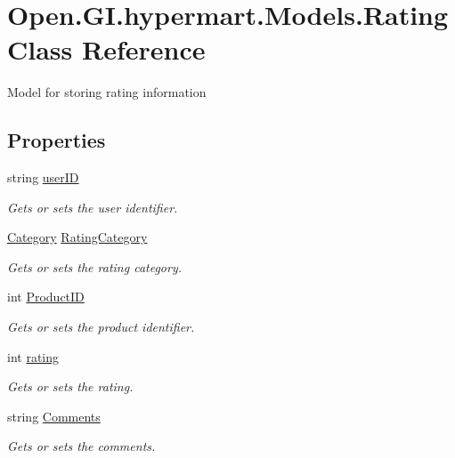 \hypertarget{class_open_1_1_g_i_1_1hypermart_1_1_models_1_1_rating}{}\section{Open.\+G\+I.\+hypermart.\+Models.\+Rating Class Reference}
\label{class_open_1_1_g_i_1_1hypermart_1_1_models_1_1_rating}


Model for storing rating information  


\subsection*{Properties}
\begin{DoxyCompactItemize}
\item 
string \hyperlink{class_open_1_1_g_i_1_1hypermart_1_1_models_1_1_rating_a1e8a569cc68356a222db0eee305273f2}{user\+I\+D}
\begin{DoxyCompactList}\small\item\em Gets or sets the user identifier. \end{DoxyCompactList}\item 
\hyperlink{class_open_1_1_g_i_1_1hypermart_1_1_models_1_1_category}{Category} \hyperlink{class_open_1_1_g_i_1_1hypermart_1_1_models_1_1_rating_af62b00743fff0a6a82381d1a943fa619}{Rating\+Category}
\begin{DoxyCompactList}\small\item\em Gets or sets the rating category. \end{DoxyCompactList}\item 
int \hyperlink{class_open_1_1_g_i_1_1hypermart_1_1_models_1_1_rating_a84ebcfe9c03b3ee3859323be1a9b02da}{Product\+I\+D}
\begin{DoxyCompactList}\small\item\em Gets or sets the product identifier. \end{DoxyCompactList}\item 
int \hyperlink{class_open_1_1_g_i_1_1hypermart_1_1_models_1_1_rating_a29969005b0621f4508ef831cd0cc883b}{rating}
\begin{DoxyCompactList}\small\item\em Gets or sets the rating. \end{DoxyCompactList}\item 
string \hyperlink{class_open_1_1_g_i_1_1hypermart_1_1_models_1_1_rating_a1b1467d2d1898f6109cc19ec24ee7fd4}{Comments}
\begin{DoxyCompactList}\small\item\em Gets or sets the comments. \end{DoxyCompactList}\end{DoxyCompactItemize}


